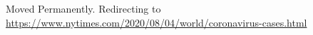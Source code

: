 Moved Permanently. Redirecting to
\href{https://www.nytimes.com/2020/08/04/world/coronavirus-cases.html}{https://www.nytimes.com/2020/08/04/world/coronavirus-cases.html}
